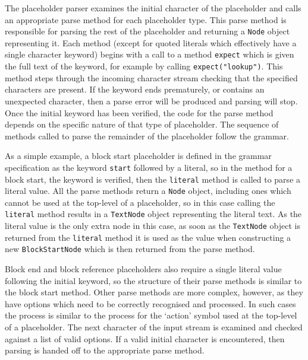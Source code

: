 The placeholder parser examines the initial character of the placeholder and calls an appropriate parse method for each placeholder type. This parse method is responsible for parsing the rest of the placeholder and returning a \verb!Node! object representing it. Each method (except for quoted literals which effectively have a single character keyword) begins with a call to a method \verb!expect! which is given the full text of the keyword, for example by calling \verb!expect("lookup")!. This method steps through the incoming character stream checking that the specified characters are present. If the keyword ends prematurely, or contains an unexpected character, then a parse error will be produced and parsing will stop. Once the initial keyword has been verified, the code for the parse method depends on the specific nature of that type of placeholder. The sequence of methods called to parse the remainder of the placeholder follow the grammar.

As a simple example, a block start placeholder is defined in the grammar specification as the keyword \verb!start! followed by a literal, so in the method for a block start, the keyword is verified, then the \verb!literal! method is called to parse a literal value. All the parse methods return a \verb!Node! object, including ones which cannot be used at the top-level of a placeholder, so in this case calling the \verb!literal! method results in a \verb!TextNode! object representing the literal text. As the literal value is the only extra node in this case, as soon as the \verb!TextNode! object is returned from the \verb!literal! method it is used as the value when constructing a new \verb!BlockStartNode! which is then returned from the parse method.

Block end and block reference placeholders also require a single literal value following the initial keyword, so the structure of their parse methods is similar to the block start method. Other parse methods are more complex, however, as they have options which need to be correctly recognised and processed. In such cases the process is similar to the process for the `action' symbol used at the top-level of a placeholder. The next character of the input stream is examined and checked against a list of valid options. If a valid initial character is encountered, then parsing is handed off to the appropriate parse method.

